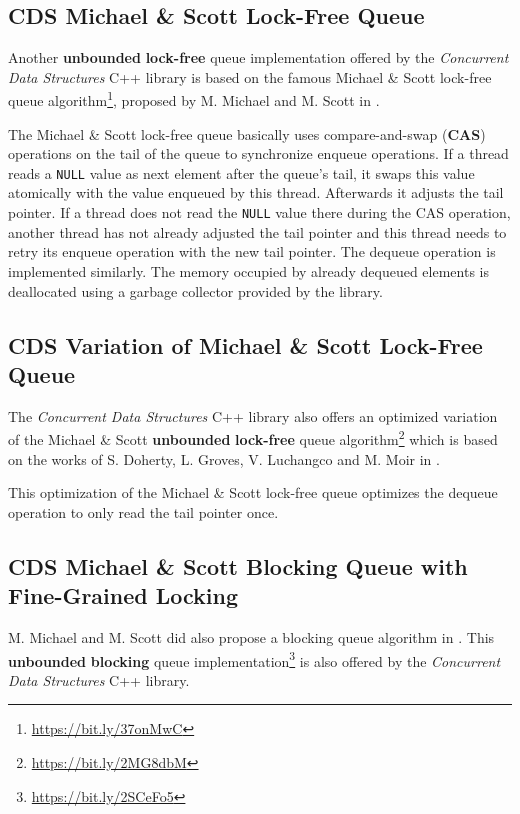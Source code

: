 \subsection[CDS MSQueue]{CDS Michael \& Scott Lock-Free Queue} \label{subsec:cds-ms}

	Another \textbf{unbounded} \textbf{lock-free} queue implementation offered by the \textit{Concurrent Data Structures} C++ library is based on the famous Michael \& Scott lock-free queue algorithm\footnote{\url{https://bit.ly/37onMwC}}, proposed by M. Michael and M. Scott in \cite{Michael:1996}.
	
	The Michael \& Scott lock-free queue basically uses compare-and-swap (\textbf{CAS}) operations on the tail of the queue to synchronize enqueue operations. If a thread reads a \texttt{NULL} value as next element after the queue's tail, it swaps this value atomically with the value enqueued by this thread. Afterwards it adjusts the tail pointer. If a thread does not read the \texttt{NULL} value there during the CAS operation, another thread has not already adjusted the tail pointer and this thread needs to retry its enqueue operation with the new tail pointer. The dequeue operation is implemented similarly. The memory occupied by already dequeued elements is deallocated using a garbage collector provided by the library.

\subsection[CDS MoirQueue]{CDS Variation of Michael \& Scott Lock-Free Queue} \label{subsec:cds-moir}

	The \textit{Concurrent Data Structures} C++ library also offers an optimized variation of the Michael \& Scott \textbf{unbounded} \textbf{lock-free} queue algorithm\footnote{\url{https://bit.ly/2MG8dbM}} which is based on the works of S. Doherty, L. Groves, V. Luchangco and M. Moir in \cite{Doherty:2004}.
	
	This optimization of the Michael \& Scott lock-free queue optimizes the dequeue operation to only read the tail pointer once.

\subsection[CDS RWQueue]{CDS Michael \& Scott Blocking Queue with Fine-Grained Locking} \label{subsec:cds-rw}

	M. Michael and M. Scott did also propose a blocking queue algorithm in \cite{Michael:1996}. This \textbf{unbounded} \textbf{blocking} queue implementation\footnote{\url{https://bit.ly/2SCeFo5}} is also offered by the \textit{Concurrent Data Structures} C++ library.
	
